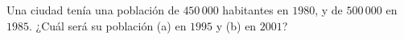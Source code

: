 \item Una ciudad tenía una población de $450\,000$ habitantes en $1980$, y de $500\,000$ en $1985$. ¿Cuál será su población (a) en $1995$ y (b) en $2001$?
